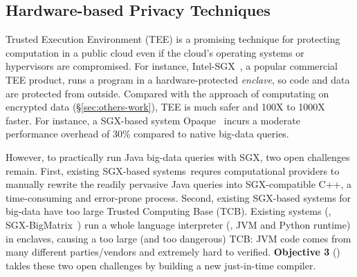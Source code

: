 % 
% 



\vspace{-.15in}\subsection{Hardware-based Privacy Techniques}
\label{sec:sgx}\vspace{-.075in}

Trusted Execution Environment (TEE) is a promising technique for
protecting computation in a public cloud even if the cloud's operating systems 
or hypervisors are compromised. For instance, Intel-SGX~\cite{intel-sgx}, a 
popular commercial TEE product, runs a program in a hardware-protected 
\emph{enclave}, so code and data are protected from outside. Compared with the 
approach of computating on encrypted data (\S\ref{sec:others-work}), TEE is much 
safer and 100X to 1000X faster. For instance, a SGX-based system 
Opaque~\cite{opaque:nsdi17} incurs a moderate performance overhead of 30\% 
compared to native big-data queries.

However, to practically run Java big-data queries with SGX, two open challenges 
remain. First, existing SGX-based systems~\cite{opaque:nsdi17}requres 
computational providers to manually rewrite the readily pervasive Java 
queries into SGX-compatible C++, a time-consuming and error-prone process.
Second, existing SGX-based systems for big-data have too large Trusted 
Computing Base (TCB). Existing systems 
(\eg, SGX-BigMatrix~\cite{bigmatrix:ccs17}) run a whole language interpreter 
(\eg, JVM and Python runtime) in enclaves, causing a too large (and too 
dangerous) TCB: JVM code comes from many different parties/vendors and 
extremely hard to verified. \textbf{Objective 3} () takles
these two open challenges by building a new just-in-time compiler.

